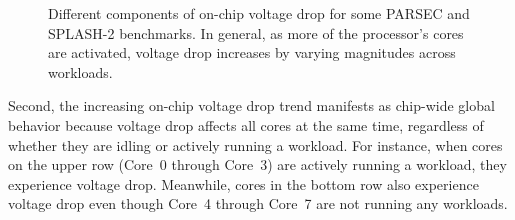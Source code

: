\begin{figure}[t]
{        \label{fig:lu_ncb_comp} 
      }
      \hspace*{-.1in} 
      \hspace*{-.1in} 
      \hspace*{-.1in} 
      \hspace*{-.1in} 
    \caption{Different components of on-chip voltage drop for some PARSEC and SPLASH-2 benchmarks. In general, as more of the processor's cores are activated, voltage drop increases by varying magnitudes across workloads.}
    \label{fig:drop-components} 
\end{figure}

Second, the increasing on-chip voltage drop trend manifests as chip-wide global behavior because voltage drop affects all cores at the same time, regardless of whether they are idling or actively running a workload. For instance, when cores on the upper row (Core~0 through Core~3) are actively running a workload, they experience voltage drop. Meanwhile, cores in the bottom row also experience voltage drop even though Core~4 through Core~7 are not running any workloads. 

